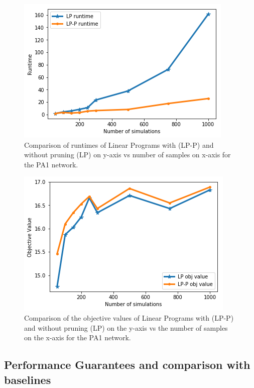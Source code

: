 \begin{figure}[!h]
    \centering
    \includegraphics[scale = 0.55]{Figuresnew/pa1_runtime.png}
    \caption{Comparison of runtimes of Linear Programs with (LP-P) and without pruning (LP) on y-axis vs 
number of samples on x-axis for the PA1 network. }
    \label{fig:pa1pruningtime}
\end{figure}



\begin{figure}[!h]
    \centering
    \includegraphics[scale = 0.55]{Figuresnew/pa1_objpruning.png}
    \caption{Comparison of the objective values of Linear Programs with (LP-P) and without pruning (LP) on the y-axis
vs the number of samples on the x-axis for the PA1 network. }
    \label{fig:pa1pruningobj}
\end{figure}

\subsection{Performance Guarantees and comparison with baselines}

